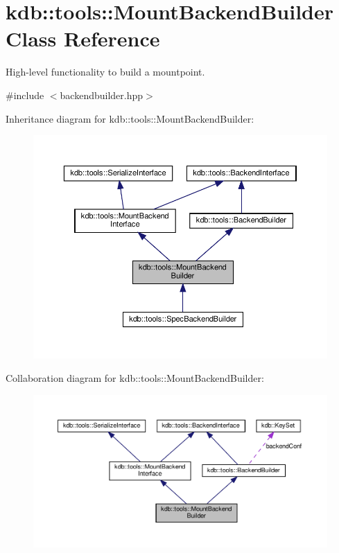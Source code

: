 \hypertarget{classkdb_1_1tools_1_1MountBackendBuilder}{}\section{kdb\+:\+:tools\+:\+:Mount\+Backend\+Builder Class Reference}
\label{classkdb_1_1tools_1_1MountBackendBuilder}


High-\/level functionality to build a mountpoint.  




{\ttfamily \#include $<$backendbuilder.\+hpp$>$}



Inheritance diagram for kdb\+:\+:tools\+:\+:Mount\+Backend\+Builder\+:
\nopagebreak
\begin{figure}[H]
\begin{center}
\leavevmode
\includegraphics[width=350pt]{classkdb_1_1tools_1_1MountBackendBuilder__inherit__graph}
\end{center}
\end{figure}


Collaboration diagram for kdb\+:\+:tools\+:\+:Mount\+Backend\+Builder\+:
\nopagebreak
\begin{figure}[H]
\begin{center}
\leavevmode
\includegraphics[width=350pt]{classkdb_1_1tools_1_1MountBackendBuilder__coll__graph}
\end{center}
\end{figure}
